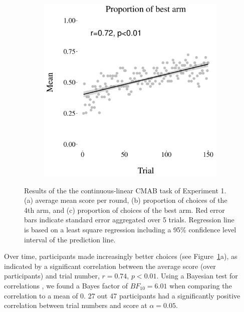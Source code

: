 \documentclass[a4paper,natbib]{apa6}
\begin{document}
\begin{figure}[ht]
\begin{subfigure}{.32\textwidth}
\caption{}
  \end{subfigure}
\begin{subfigure}{.32\textwidth}
  \centering
\includegraphics[width=.95\textwidth]{figure24.pdf}
\caption{}  
\end{subfigure}
\caption{Results of the the continuous-linear CMAB task of Experiment 1. (a) average mean score per round, (b) proportion of choices of the 4th arm, and (c) proportion of choices of the best arm. Red error bars indicate standard error aggregated over 5 trials. Regression line is based on a least square regression including a 95\% confidence level interval of the prediction line.}
\label{fig:binary}
\end{figure}

Over time, participants made increasingly better choices (see Figure~\ref{fig:binary}a), as indicated by a significant correlation between the average score (over participants) and trial number, $r=0.74$, $p<0.01$. Using a Bayesian test for correlations \citep{wetzels2012default}, we found a Bayes factor of $BF_{10}=6.01$ when comparing the correlation to a mean of 0. 27 out 47 participants had a significantly positive correlation between trial numbers and score at $\alpha=0.05$.
\end{document}
